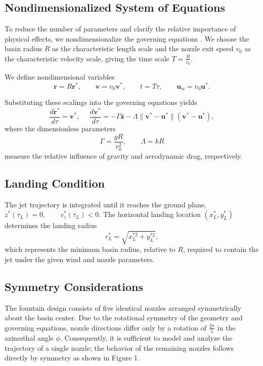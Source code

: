 \documentclass{article}
\begin{document}
\subsection{Nondimensionalized System of Equations}

To reduce the number of parameters and clarify the relative importance of physical effects, we nondimensionalize the governing equations \cite{WallsDanielsProjectile2022}. We choose the basin radius \(R\) as the characteristic length scale and the nozzle exit speed \(v_0\) as the characteristic velocity scale, giving the time scale $T = \frac{R}{v_0}.$

We define nondimensional variables
\[
\mathbf{r} = R \mathbf{r}^*, \qquad
\mathbf{v} = v_0 \mathbf{v}^*, \qquad
t = T \tau, \qquad
\mathbf{u}_w = v_0 \mathbf{u}^*.
\]

Substituting these scalings into the governing equations yields
\[
\frac{d\mathbf{r}^*}{d\tau} = \mathbf{v}^*,
\ \ \ \ \ \ 
\frac{d\mathbf{v}^*}{d\tau}
= - \Gamma \hat{\mathbf{z}}
- \Lambda \lVert \mathbf{v}^* - \mathbf{u}^* \rVert (\mathbf{v}^* - \mathbf{u}^*),
\]
where the dimensionless parameters
\[
\Gamma = \frac{gR}{v_0^2}, \qquad
\Lambda = kR
\]
measure the relative influence of gravity and aerodynamic drag, respectively.

\subsection{Landing Condition}

The jet trajectory is integrated until it reaches the ground plane,
$z^*(\tau_L) = 0, \qquad v_z^*(\tau_L) < 0.$
The horizontal landing location \((x_L^*, y_L^*)\) determines the landing radius
\[
r_L^* = \sqrt{x_L^{*2} + y_L^{*2}},
\]
which represents the minimum basin radius, relative to \(R\), required to contain the jet under the given wind and nozzle parameters.

\subsection{Symmetry Considerations}
The fountain design consists of five identical nozzles arranged symmetrically about the basin center. Due to the rotational symmetry of the geometry and governing equations, nozzle directions differ only by a rotation of $\frac{2\pi}{5}$ in the azimuthal angle $\phi$. Consequently, it is sufficient to model and analyze the trajectory of a single nozzle; the behavior of the remaining nozzles follows directly by symmetry as shown in Figure 1.
\end{document}
